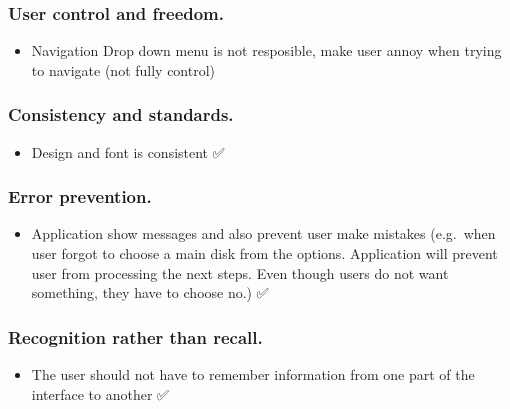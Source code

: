 \documentclass[
]{article}
\providecommand{\tightlist}{%
  \setlength{\itemsep}{0pt}\setlength{\parskip}{0pt}}
\begin{document}
\hypertarget{user-control-and-freedom.}{%
\subsubsection{User control and
freedom.}\label{user-control-and-freedom.}}

\begin{itemize}
\tightlist
\item
  Navigation Drop down menu is not resposible, make user annoy when
  trying to navigate (not fully control)
\end{itemize}

\hypertarget{consistency-and-standards.}{%
\subsubsection{Consistency and
standards.}\label{consistency-and-standards.}}

\begin{itemize}
\tightlist
\item
  Design and font is consistent ✅
\end{itemize}

\hypertarget{error-prevention.}{%
\subsubsection{Error prevention.}\label{error-prevention.}}

\begin{itemize}
\tightlist
\item
  Application show messages and also prevent user make mistakes
  (e.g.~when user forgot to choose a main disk from the options.
  Application will prevent user from processing the next steps. Even
  though users do not want something, they have to choose no.) ✅
\end{itemize}

\hypertarget{recognition-rather-than-recall.}{%
\subsubsection{Recognition rather than
recall.}\label{recognition-rather-than-recall.}}

\begin{itemize}
\tightlist
\item
  The user should not have to remember information from one part of the
  interface to another ✅
\end{itemize}
\end{document}
